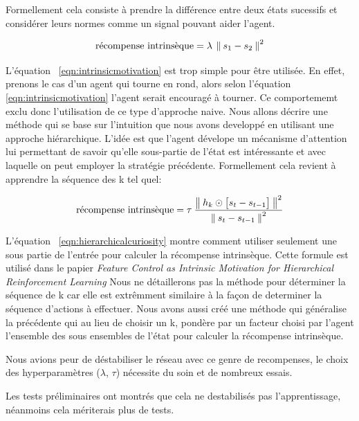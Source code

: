 Formellement cela consiste à prendre la différence entre deux états sucessifs et considérer leurs normes comme un signal pouvant aider l'agent.

\begin{equation}
\text{récompense intrinsèque} = \lambda \: \left\lVert\: s_1 - s_2 \:\right\rVert^2 
\label{eqn:intrinsicmotivation}
\end{equation}

L'équation ~\ref{eqn:intrinsicmotivation} est trop simple pour être utilisée. En effet, prenons le cas d'un agent qui tourne en rond, alors selon l'équation \ref{eqn:intrinsicmotivation} l'agent serait encouragé à tourner. Ce comportememt exclu donc l'utilisation de ce type d'approche naive. Nous allons décrire une méthode qui se base sur l'intuition que nous avons developpé en utilisant une approche hiérarchique. L'idée est que l'agent dévelope un mécanisme d'attention lui permettant de savoir qu'elle sous-partie de l'état est intéressante et avec laquelle on peut employer la stratégie précédente.
Formellement cela revient à apprendre la séquence des k tel quel:

\begin{equation}\label{eqn:hierarchicalcuriosity} 
    \text{récompense intrinsèque} = \tau\: \frac{\left\lVert\: h_k \odot \big[ s_t - s_{t-1} \big] \:\right\rVert^2}{\left\lVert\: s_t - s_{t-1}   \:\right\rVert^2}  
\end{equation}

L'équation ~\ref{eqn:hierarchicalcuriosity} montre comment utiliser seulement une sous partie de l'entrée pour calculer la récompense intrinsèque. Cette formule est utilisé dans le papier \emph{Feature Control as Intrinsic Motivation for Hierarchical Reinforcement Learning}\cite{hierarchicalcuriosity}
Nous ne détaillerons pas la méthode pour déterminer la séquence de k car elle est extrêmment similaire à la façon de determiner la séquence d'actions à effectuer. Nous avons aussi créé une méthode qui généralise la précédente qui au lieu de choisir un k, pondère par un facteur choisi par l'agent l'ensemble des sous ensembles de l'état pour calculer la récompense intrinsèque.

Nous avions peur de déstabiliser le réseau avec ce genre de recompenses, le choix des hyperparamètres ($\lambda$, $\tau$) nécessite du soin et de nombreux essais.

Les tests préliminaires ont montrés que cela ne destabilisés pas l'apprentissage, néanmoins cela mériterais plus de tests.

